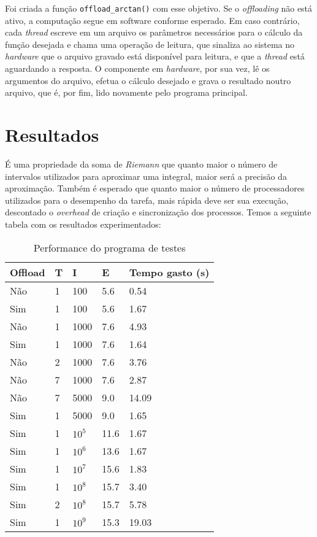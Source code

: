 \documentclass[11pt, a4paper]{article}
\begin{document}
Foi criada a função \texttt{offload\_arctan()} com esse objetivo. Se o \textit{offloading} não está ativo, a computação segue em software conforme esperado. Em caso contrário, cada \textit{thread} escreve em um arquivo os parâmetros necessários para o cálculo da função desejada e chama uma operação de leitura, que sinaliza ao sistema no \textit{hardware} que o arquivo gravado está disponível para leitura, e que a \textit{thread} está aguardando a resposta. O componente em \textit{hardware}, por sua vez, lê os argumentos do arquivo, efetua o cálculo desejado e grava o resultado noutro arquivo, que é, por fim, lido novamente pelo programa principal.

\section {Resultados}

É uma propriedade da soma de \textit{Riemann} que quanto maior o número de intervalos utilizados para aproximar uma integral, maior será a precisão da aproximação. Também é esperado que quanto maior o número de processadores utilizados para o desempenho da tarefa, mais rápida deve ser sua execução, descontado o \textit{overhead} de criação e sincronização dos processos. Temos a seguinte tabela com os resultados experimentados:

\begin{table}[h]
\centering
\caption{Performance do programa de testes}
\label{my-label}
\begin{tabular}{|lllll|}
\hline
Offload & T & I      & E    & Tempo gasto (s) \\ \hline
Não     & 1 & 100    & 5.6  & 0.54            \\
Sim     & 1 & 100    & 5.6  & 1.67            \\
Não     & 1 & 1000   & 7.6  & 4.93            \\
Sim     & 1 & 1000   & 7.6  & 1.64            \\
Não     & 2 & 1000   & 7.6  & 3.76            \\
Não     & 7 & 1000   & 7.6  & 2.87            \\
Não     & 7 & 5000   & 9.0  & 14.09           \\
Sim     & 1 & 5000   & 9.0  & 1.65            \\
Sim     & 1 & $10^5$ & 11.6 & 1.67            \\
Sim     & 1 & $10^6$ & 13.6 & 1.67            \\
Sim     & 1 & $10^7$ & 15.6 & 1.83            \\
Sim     & 1 & $10^8$ & 15.7 & 3.40            \\
Sim     & 2 & $10^8$ & 15.7 & 5.78            \\
Sim     & 1 & $10^9$ & 15.3 & 19.03           \\ \hline
\end{tabular}
\end{table}
\end{document}
